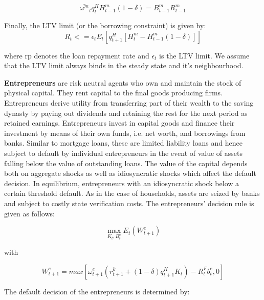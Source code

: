 \documentclass[12pt]{article}
\numberwithin{equation}{section}
\begin{document}
\begin{equation}
\bar{\omega^m}_t q^H_{t} H^m_{t-1}(1-\delta) = B^m_{t-1}R^m_{t-1}
\end{equation}


Finally, the LTV limit (or the borrowing constraint) is given by:
\begin{equation}
[B^m_{t}-(1-rp)B^m_{t-1}]R_{t} <=\epsilon_{t} E_t[q^H_{t+1} [H^m_t-H^m_{t-1}(1-\delta)]]
\end{equation}

where rp denotes the loan repayment rate and $\epsilon_{t}$ is the LTV limit. We assume that the LTV limit always binds in the steady state and it's neighbourhood.


\noindent
\textbf{Entrepreneurs } are risk neutral agents who own and maintain the stock of physical capital. They rent  capital to the final goods producing firms. Entrepreneurs derive utility from transferring part of their wealth to the saving dynasty by paying out dividends and retaining the rest for the next period as retained earnings. Entrepreneurs invest in capital goods and finance their investment by means of their own funds, i.e. net worth, and borrowings from banks. Similar to mortgage loans, these are limited liability loans and hence subject to default by individual entrepreneurs in the event of value of assets falling below the value of outstanding loans. The value of the capital depends both on aggregate shocks  as well as idiosyncratic shocks which affect the default decision. In equilibrium, entrepreneurs with an idiosyncratic shock below a certain threshold default.  As in the case of households, assets are seized by banks and subject to costly state verification costs. The entrepreneurs' decision rule is given as follows: 

\begin{equation}
\max_{K_t,B^e_t}E_t(W^e_{t+1})
\end{equation}	

with

\begin{equation}
W^e_{t+1}=max[\omega^e_{t+1}(r^k_{t+1}+(1-\delta)q^K_{t+1}K_{t})-R^F_{t}b^e_{t},0]
\end{equation}


The default decision of the entrepreneurs is determined by: 
\end{document}
